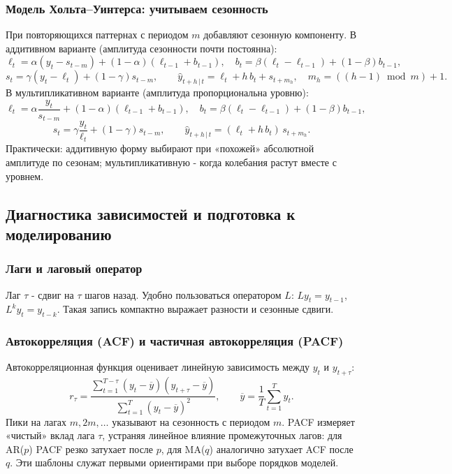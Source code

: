 \documentclass[12pt,a4paper]{article}
\begin{document}
\subsubsection{Модель Хольта–Уинтерса: учитываем сезонность}
При повторяющихся паттернах с периодом $m$ добавляют сезонную компоненту. В аддитивном варианте (амплитуда сезонности почти постоянна):
\[
\ell_t=\alpha (y_t-s_{t-m})+(1-\alpha)(\ell_{t-1}+b_{t-1}), \quad
b_t=\beta(\ell_t-\ell_{t-1})+(1-\beta)b_{t-1},
\]
\[
s_t=\gamma (y_t-\ell_t)+(1-\gamma)s_{t-m}, \qquad
\hat y_{t+h\,|\,t}=\ell_t+h\,b_t+s_{t+m_h}, \quad m_h=((h-1)\bmod m)+1.
\]
В мультипликативном варианте (амплитуда пропорциональна уровню):
\[
\ell_t=\alpha \frac{y_t}{s_{t-m}}+(1-\alpha)(\ell_{t-1}+b_{t-1}), \quad
b_t=\beta(\ell_t-\ell_{t-1})+(1-\beta)b_{t-1},
\]
\[
s_t=\gamma \frac{y_t}{\ell_t}+(1-\gamma)s_{t-m}, \qquad
\hat y_{t+h\,|\,t}=(\ell_t+h\,b_t)\,s_{t+m_h}.
\]
Практически: аддитивную форму выбирают при «похожей» абсолютной амплитуде по сезонам; мультипликативную - когда колебания растут вместе с уровнем.

\subsection{Диагностика зависимостей и подготовка к моделированию}

\subsubsection{Лаги и лаговый оператор}
Лаг $\tau$ - сдвиг на $\tau$ шагов назад. Удобно пользоваться оператором $L$: $Ly_t=y_{t-1}$, $L^k y_t=y_{t-k}$. Такая запись компактно выражает разности и сезонные сдвиги.

\subsubsection{Автокорреляция (ACF) и частичная автокорреляция (PACF)}
Автокорреляционная функция оценивает линейную зависимость между $y_t$ и $y_{t+\tau}$:
\[
r_\tau=\frac{\sum_{t=1}^{T-\tau}(y_t-\overline y)(y_{t+\tau}-\overline y)}{\sum_{t=1}^T (y_t-\overline y)^2}, \qquad
\overline y=\frac{1}{T}\sum_{t=1}^T y_t.
\]
Пики на лагах $m,2m,\dots$ указывают на сезонность с периодом $m$. PACF измеряет «чистый» вклад лага $\tau$, устраняя линейное влияние промежуточных лагов: для AR($p$) PACF резко затухает после $p$, для MA($q$) аналогично затухает ACF после $q$. Эти шаблоны служат первыми ориентирами при выборе порядков моделей.
\end{document}

